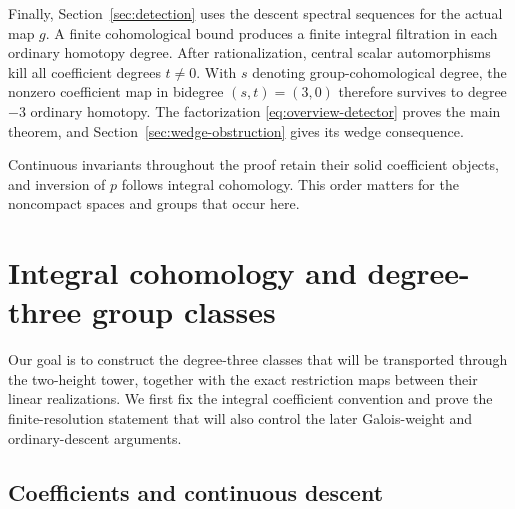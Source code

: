 \documentclass[11pt]{article}
\numberwithin{equation}{section}
\theoremstyle{definition}
\theoremstyle{remark}
\begin{document}
Finally, Section~\ref{sec:detection} uses the descent spectral
sequences for the actual map \(g\). A finite cohomological bound
produces a finite integral filtration in each ordinary homotopy
degree. After rationalization, central scalar automorphisms kill
all coefficient degrees \(t\ne0\). With \(s\) denoting group-cohomological
degree, the nonzero coefficient map in bidegree \((s,t)=(3,0)\) therefore survives to degree \(-3\) ordinary
homotopy. The factorization \eqref{eq:overview-detector} proves the
main theorem, and Section~\ref{sec:wedge-obstruction} gives its
wedge consequence.

Continuous invariants throughout the proof retain their solid
coefficient objects, and inversion of \(p\) follows integral cohomology.
This order matters for the noncompact spaces and groups that occur here.

\section{Integral cohomology and degree-three group classes}
\label{sec:cohomology}

Our goal is to construct the degree-three classes that will be transported
through the two-height tower, together with the exact restriction maps
between their linear realizations. We first fix the integral coefficient
convention and prove the finite-resolution statement that will also
control the later Galois-weight and ordinary-descent arguments.

\subsection{Coefficients and continuous descent}
\end{document}
